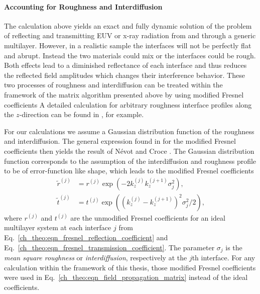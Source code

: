 \paragraph{Accounting for Roughness and Interdiffusion}
The calculation above yields an exact and fully dynamic solution of the problem of reflecting and transmitting EUV or x-ray radiation from and through a generic multilayer. However, in a realistic sample the interfaces will not be perfectly flat and abrupt. Instead the two materials could mix or the interfaces could be rough. Both effects lead to a diminished reflectance of each interface and thus reduces the reflected field amplitudes which changes their interference behavior. These two processes of roughness and interdiffusion can be treated within the framework of the matrix algorithm presented above by using modified Fresnel coefficients A detailed calculation for arbitrary roughness interface profiles along the $z$-direction can be found in \cite{vidal_metallic_1984}, for example.

For our calculations we assume a Gaussian distribution function of the roughness and interdiffusion. The general expression found in \cite{vidal_metallic_1984} for the modified Fresnel coefficients then yields the result of N\'{e}vot and Croce \cite{croce_p._etude_1976}. The Gaussian distribution function corresponds to the assumption of the interdiffusion and roughness profile to be of error-function like shape, which leads to the modified Fresnel coefficients
\begin{align}
       \tilde{r}^{(j)} &= r^{(j)} \exp(-2 k_z^{(j)} k_z^{(j+1)} 
\sigma_j^2)\text{,} \nonumber \\
       \tilde{t}^{(j)} &= t^{(j)} \exp((k_z^{(j)} - k_z^{(j+1)})^2 \sigma_j^2/2) 
\text{,} \label{eqn:mod_fresnel}
\end{align}
where $r^{(j)}$ and $t^{(j)}$ are the unmodified Fresnel coefficients for an ideal multilayer system at each interface $j$ from Eq.~\eqref{ch_theo:eqn_fresnel_reflection_coefficient} and Eq.~\eqref{ch_theo:eqn_fresnel_transmission_coefficient}. The parameter $\sigma_j$ is the \emph{mean square roughness} or \emph{interdiffusion}, respectively at the $j$th interface. For any calculation within the framework of this thesis, those modified Fresnel coefficients were used in Eq.~\eqref{ch_theo:eqn_field_propagation_matrix} instead of the ideal coefficients.



